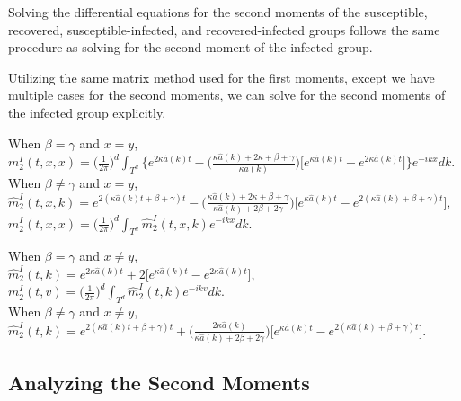 \documentclass[sn-basic]{sn-jnl}%
\theoremstyle{thmstyleone}%
\theoremstyle{thmstyletwo}%
\theoremstyle{thmstylethree}%
\numberwithin{equation}{theorem}
\begin{document}
Solving the differential equations for the second moments of the susceptible, recovered, susceptible-infected, and recovered-infected groups follows the same procedure as solving for the second moment of the infected group.

Utilizing the same matrix method used for the first moments, except we have multiple cases for the second moments, we can solve for the second moments of the infected group explicitly.

When $\beta= \gamma$ and $x=y$,\\
$m_{2}^{I}(t,x,x) = \Big(\frac{1}{2\pi}\Big)^{d} \int_{T^d} \Big\{ e^{ 2 \kappa \hat{a}(k)t} - \Big(\frac{\kappa\hat{a}(k)+2\kappa+\beta+\gamma}{\kappa\hat{a}(k)}\Big) \Big[e^{\displaystyle \kappa \hat{a}(k)t} - e^{\displaystyle 2\kappa \hat{a}(k)t} \Big] \Big\} e^{\displaystyle -ikx}dk$.\\

When $\beta \neq \gamma$ and $x=y$,\\
$\hat{m}_{2}^{I}(t,x,k) = 
e^{\displaystyle 2(\kappa\hat{a}(k)t+\beta+\gamma)t} - \Big(\frac{\kappa\hat{a}(k)+2\kappa+\beta+\gamma}{\kappa\hat{a}(k)+2\beta+2\gamma}\Big)\Big[e^{\displaystyle \kappa\hat{a}(k)t} - e^{\displaystyle 2(\kappa\hat{a}(k)+\beta+\gamma)t}\Big]$,\\

$m_{2}^{I}(t,x,x)= \displaystyle \Big(\frac{1}{2\pi}\Big)^{d} \int_{T^d} \hat{m}_{2}^{I}(t,x,k) e^{\displaystyle -ikx} dk$.

When $\beta=\gamma$ and $x \neq y$,\\
$\hat{m}_{2}^{I}(t,k)= 
e^{\displaystyle 2 \kappa \hat{a}(k)t} + 2 \Big[e^{\displaystyle \kappa \hat{a}(k)t} - e^{\displaystyle 2\kappa \hat{a}(k)t} \Big]$,\\

$m_{2}^{I}(t,v)= \displaystyle \Big(\frac{1}{2\pi}\Big)^{d} \int_{T^d} \hat{m}_{2}^{I}(t,k) e^{\displaystyle -ikv} dk$.\\

When $\beta \neq \gamma$ and $x \neq y$,\\
$\hat{m}_{2}^{I}(t,k) = 
e^{\displaystyle 2(\kappa\hat{a}(k)t+\beta+\gamma)t} + \Big(\frac{2 \kappa\hat{a}(k)}{\kappa\hat{a}(k)+2\beta+2\gamma}\Big)\Big[e^{\displaystyle \kappa\hat{a}(k)t} - e^{\displaystyle 2(\kappa\hat{a}(k)+\beta+\gamma)t}\Big]$.\\

\subsection{Analyzing the Second Moments}
\end{document}
